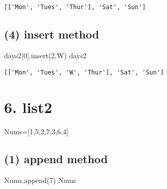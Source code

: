 \documentclass[
  letterpaper,
  DIV=11,
  numbers=noendperiod]{scrreprt}
\newenvironment{Shaded}{\begin{snugshade}}{\end{snugshade}}
\newcommand{\DecValTok}[1]{\textcolor[rgb]{0.68,0.00,0.00}{#1}}
\newcommand{\NormalTok}[1]{\textcolor[rgb]{0.00,0.23,0.31}{#1}}
\newcommand{\OperatorTok}[1]{\textcolor[rgb]{0.37,0.37,0.37}{#1}}
\newcommand{\StringTok}[1]{\textcolor[rgb]{0.13,0.47,0.30}{#1}}
\begin{document}
\begin{verbatim}
[['Mon', 'Tues', 'Thur'], 'Sat', 'Sun']
\end{verbatim}

\subsection*{(4) insert method}\label{insert-method}

\begin{Shaded}
\begin{Highlighting}[]
\NormalTok{days2[}\DecValTok{0}\NormalTok{].insert(}\DecValTok{2}\NormalTok{,}\StringTok{\textquotesingle{}W\textquotesingle{}}\NormalTok{)}
\NormalTok{days2}
\end{Highlighting}
\end{Shaded}

\begin{verbatim}
[['Mon', 'Tues', 'W', 'Thur'], 'Sat', 'Sun']
\end{verbatim}

\section*{6. list2}\label{list2}


\begin{Shaded}
\begin{Highlighting}[]
\NormalTok{Nums}\OperatorTok{=}\NormalTok{[}\DecValTok{1}\NormalTok{,}\DecValTok{5}\NormalTok{,}\DecValTok{2}\NormalTok{,}\DecValTok{7}\NormalTok{,}\DecValTok{3}\NormalTok{,}\DecValTok{6}\NormalTok{,}\DecValTok{4}\NormalTok{]}
\end{Highlighting}
\end{Shaded}

\subsection*{(1) append method}\label{append-method}

\begin{Shaded}
\begin{Highlighting}[]
\NormalTok{Nums.append(}\DecValTok{7}\NormalTok{)}
\NormalTok{Nums}
\end{Highlighting}
\end{Shaded}
\end{document}
